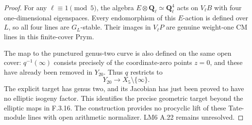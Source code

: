 \begin{proof}
For any $\ell\equiv1\pmod5$, the algebra
$E\otimes\mathbf Q_\ell\simeq\mathbf Q_\ell^4$ acts on
$V_\ell B$ with four one-dimensional eigenspaces. Every endomorphism
of this $E$-action is defined over $L$, so all four lines are
$G_L$-stable. Their images in $V_\ell P$ are genuine weight-one
CM lines in this finite-cover Prym.

The map to the punctured genus-two curve is also defined on the same
open cover: $q^{-1}(\infty)$ consists precisely of the coordinate-zero
points $z=0$, and these have already been removed in $Y_{20}$.
Thus $q$ restricts to
\[
 Y_{20}\longrightarrow X_5\setminus\{\infty\}.
\]
The explicit target has genus two, and its Jacobian has just been
proved to have no elliptic isogeny factor. This identifies the precise
geometric target beyond the elliptic maps in F.3.16. The construction
provides no procyclic lift of these Tate-module lines with open
arithmetic normalizer. LM6 A.22 remains unresolved.
\end{proof}

